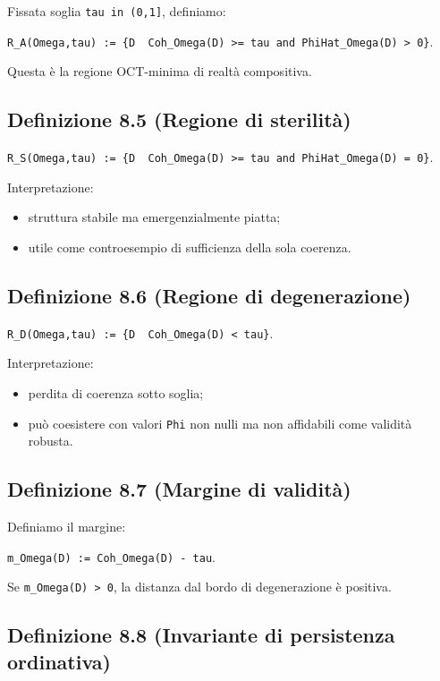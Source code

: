 Fissata soglia \texttt{tau\ in\ (0,1{]}}, definiamo:

\texttt{R\_A(Omega,tau)\ :=\ \{D\ \textbar{}\ Coh\_Omega(D)\ \textgreater{}=\ tau\ and\ PhiHat\_Omega(D)\ \textgreater{}\ 0\}}.

Questa è la regione OCT-minima di realtà compositiva.

\subsection{Definizione 8.5 (Regione di sterilità)}

\texttt{R\_S(Omega,tau)\ :=\ \{D\ \textbar{}\ Coh\_Omega(D)\ \textgreater{}=\ tau\ and\ PhiHat\_Omega(D)\ =\ 0\}}.

Interpretazione:

\begin{itemize}
\tightlist
\item
  struttura stabile ma emergenzialmente piatta;
\item
  utile come controesempio di sufficienza della sola coerenza.
\end{itemize}

\subsection{Definizione 8.6 (Regione di degenerazione)}

\texttt{R\_D(Omega,tau)\ :=\ \{D\ \textbar{}\ Coh\_Omega(D)\ \textless{}\ tau\}}.

Interpretazione:

\begin{itemize}
\tightlist
\item
  perdita di coerenza sotto soglia;
\item
  può coesistere con valori \texttt{Phi} non nulli ma non affidabili come validità robusta.
\end{itemize}

\subsection{Definizione 8.7 (Margine di validità)}

Definiamo il margine:

\texttt{m\_Omega(D)\ :=\ Coh\_Omega(D)\ -\ tau}.

Se \texttt{m\_Omega(D)\ \textgreater{}\ 0}, la distanza dal bordo di degenerazione è positiva.

\subsection{Definizione 8.8 (Invariante di persistenza ordinativa)}


